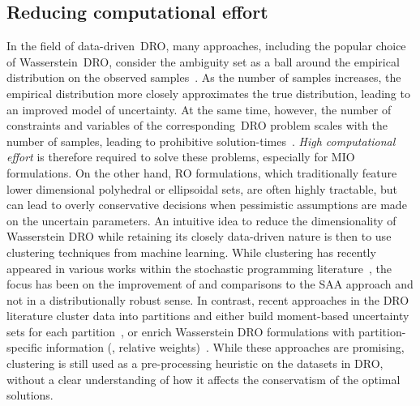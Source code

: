 \subsection{Reducing computational effort}
In the field of data-driven~\gls{DRO}, many approaches, including the popular choice of Wasserstein~\gls{DRO}, consider the ambiguity set as a ball around the empirical distribution on the observed samples~\cite{dro_survey}. As the number of samples increases, the empirical distribution more closely approximates the true distribution, leading to an improved model of uncertainty. At the same time, however, the number of constraints and variables of the corresponding~\gls{DRO} problem scales with the number of samples, leading to prohibitive solution-times~\cite{mohajerin_esfahani_data-driven_2018}. \emph{High computational effort} is therefore required to solve these problems, especially for \gls{MIO} formulations. On the other hand, \gls{RO} formulations, which traditionally feature lower dimensional polyhedral or ellipsoidal sets, are often highly tractable, but can lead to overly conservative decisions when pessimistic assumptions are made on the uncertain parameters. 
An intuitive idea to reduce the dimensionality of Wasserstein \gls{DRO} while retaining its closely data-driven nature is then to use clustering techniques from machine learning.
While clustering has recently appeared in various works within the stochastic programming literature~\citep{SAA1, SAA2, SAA3, SAA4}, the focus has been on the improvement of and comparisons to the \gls{SAA} approach and not in a distributionally robust sense.
In contrast, recent approaches in the \gls{DRO} literature cluster data into partitions and either build moment-based uncertainty sets for each partition~\citep{Rsome, perakis2022robust}, or enrich Wasserstein \gls{DRO} formulations with partition-specific information (\eg, relative weights)~\citep{partition}.
While these approaches are promising, clustering is still used as a pre-processing heuristic on the datasets in \gls{DRO}, without a clear understanding of how it affects the conservatism of the optimal solutions.

